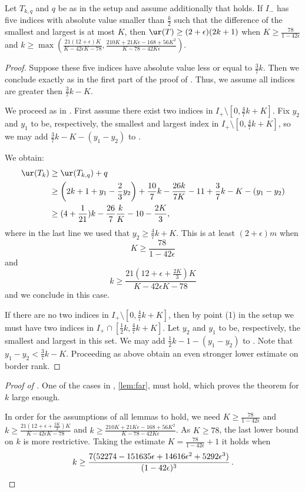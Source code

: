 \documentclass{toc}
\begin{document}
\begin{lemma} \label{lem:near}
 Let $T_{k,q}$ and $q$ be as in the setup and assume
additionally that  holds.
If  $I_{-}$ has five  indices with absolute value smaller than $\frac{k}{2}$
such that the difference of the smallest and largest is at most $K$, 
then
$\ur(T)\geq (2+\epsilon)(2k+1)$ when
$
K\geq \frac{78}{1-42\epsilon}
$
and
$
k\geq \max(\frac{21(12+ \epsilon)K}{K-42\epsilon K-78},\frac{210K+21K\epsilon-168+56K^2}{K-78-42K\epsilon}).
$
\end{lemma}
\begin{proof}
Suppose these five indices have absolute value less or equal to $\frac{3}{7}k$. Then we conclude exactly as in the first part of the proof of . Thus, we assume all indices are greater then $\frac{3}{7}k-K$.

We proceed as in . First assume there exist two indices in $I_{+}\setminus [0,\frac{4}{7}k+K]$. Fix $y_2$ and $y_1$ to be, respectively, %
the smallest and largest index in $I_{+}\setminus [0,\frac{4}{7}k+K]$,
so we may add $\frac{3}7k-K-(y_1-y_2)$ to .

We obtain:
\begin{align*}
\ur(T_k)&\geq \ur(T_{k,q})+q\\
&\geq \left(2k+1+y_1-\frac 23 y_2\right)+ \frac{10}{7}k-\frac{26k}{7K}-11+\frac 37 k-K-(y_1-y_2)\\
&\geq (4+\frac 1{21})k-\frac{26}{7}\frac kK -10-\frac{2K}{3},
\end{align*}
where in the last line we used that $y_2\geq \frac 47k+K$.
This is at least $(2+\epsilon)m$ when
$$
K\geq \frac{78}{1-42\epsilon}
$$
and
$$
k\geq \frac{21(12+ \epsilon+\frac{2K}{3})K}{K-42\epsilon K-78}
$$
and we conclude in this case.

If there are no two indices in $I_{+}\setminus [0,\frac{4}{7}k+K]$, then by point (1) in the setup we must have two indices in $I_{+}\cap [\frac{1}{2}k, \frac{4}{7}k+K]$. Let $y_2$ and $y_1$ to be, respectively, %
the smallest and largest in this set.
We may add $\frac{1}{2}k-1-(y_1-y_2)$ to . Note that $y_1-y_2<\frac{3}{7}k-K$. Proceeding as above obtain an even stronger lower estimate on border rank.
\end{proof}
\begin{proof}[Proof of ]
One of the cases in ,
%
\ref{lem:far},  must hold, 
which proves the theorem for $k$ large enough.

In order for
the  %
assumptions of all lemmas to hold,  we need $K\geq \frac{78}{1-42\epsilon}$ and
$k\geq \frac{21(12+ \epsilon+\frac{2K}{3})K}{K-42\epsilon K-78}$
 and $k\geq \frac{210K+21K\epsilon-168+56K^2}{K-78-42K\epsilon}$.
As $K\geq 78$, the last lower bound on $k$ is more restrictive.  
Taking the estimate $K=\frac{78}{1-42\epsilon}+1$ 
 it holds when
 \[k\geq \frac{7 (52274 - 151635 \epsilon + 14616 \epsilon^2 + 5292 \epsilon^3)}{(1 - 42 \epsilon)^3 }\,.  \qedhere \] 
 \end{proof}
\end{document}
